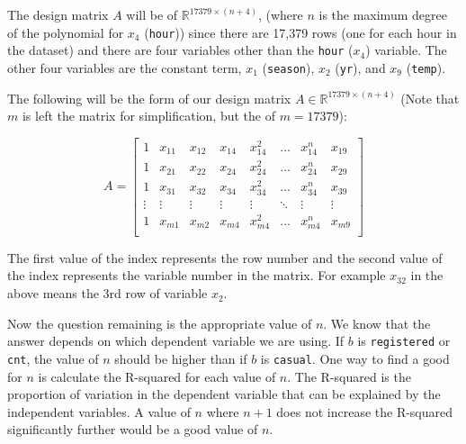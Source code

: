 \documentclass[
]{article}
\begin{document}
The design matrix \(A\) will be of \(\mathbb{R}^{17379 \times (n+4)}\),
(where \(n\) is the maximum degree of the polynomial for \(x_{4}\)
(\texttt{hour})) since there are 17,379 rows (one for each hour in the
dataset) and there are four variables other than the \texttt{hour}
(\(x_{4}\)) variable. The other four variables are the constant term,
\(x_{1}\) (\texttt{season}), \(x_{2}\) (\texttt{yr}), and \(x_{9}\)
(\texttt{temp}).

The following will be the form of our design matrix
\(A \in \mathbb{R}^{17379 \times (n+4)}\) (Note that \(m\) is left the
matrix for simplification, but the of \(m = 17379\)):

\[
A=
  \begin{bmatrix}
    1 & x_{11} & x_{12} & x_{14} & x_{14}^{2} & \dots & x_{14}^{n} & x_{19} \\
    1 & x_{21} & x_{22} & x_{24} & x_{24}^{2} & \dots & x_{24}^{n} & x_{29} \\
    1 & x_{31} & x_{32} & x_{34} & x_{34}^{2} & \dots & x_{34}^{n} & x_{39} \\
    \vdots & \vdots & \vdots & \vdots & \vdots & \ddots & \vdots & \vdots \\
    1 & x_{m1} & x_{m2} & x_{m4} & x_{m4}^{2} & \dots & x_{m4}^{n} & x_{m9} \\
  \end{bmatrix} 
\]

The first value of the index represents the row number and the second
value of the index represents the variable number in the matrix. For
example \(x_{32}\) in the above means the 3rd row of variable \(x_{2}\).

Now the question remaining is the appropriate value of \(n\). We know
that the answer depends on which dependent variable we are using. If
\(b\) is \texttt{registered} or \texttt{cnt}, the value of \(n\) should
be higher than if \(b\) is \texttt{casual}. One way to find a good for
\(n\) is calculate the R-squared for each value of \(n\). The R-squared
is the proportion of variation in the dependent variable that can be
explained by the independent variables. A value of \(n\) where \(n+1\)
does not increase the R-squared significantly further would be a good
value of \(n\).
\end{document}
